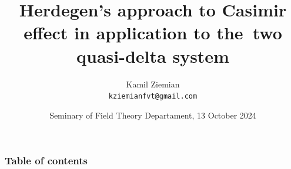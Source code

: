 \documentclass[10pt,t]{beamer}
\title{Herdegen's approach to Casimir effect in application to
  the~two quasi-delta system}
\author{Kamil Ziemian \\
  \texttt{kziemianfvt@gmail.com}}
\date[13 X 2024]{Seminary of Field Theory Departament,
  13 October 2024}
\begin{document}





\RaggedRight





\maketitle





\begin{frame}
  \frametitle{Table of contents}


  \tableofcontents %

\end{frame}
















\end{document}
